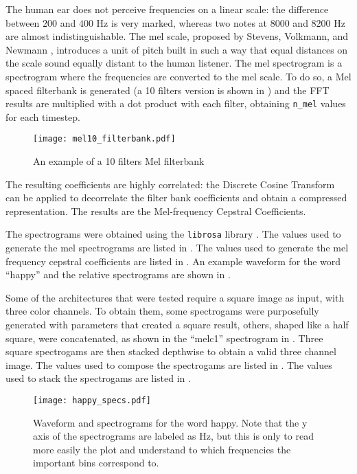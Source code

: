 The human ear does not perceive frequencies on a linear scale: the difference
between $200$ and $400$ Hz is very marked, whereas two notes at $8000$ and
$8200$ Hz are almost indistinguishable. The mel scale, proposed by Stevens,
Volkmann, and Newmann \cite{melscale1937}, introduces a unit of pitch built in
such a way that equal distances on the scale sound equally distant to the human
listener.
The mel spectrogram is a spectrogram where the frequencies are converted to the
mel scale. To do so, a Mel spaced filterbank is generated (a 10 filters version
is shown in ) and the FFT results are multiplied with
a dot product with each filter, obtaining \texttt{n\_mel} values for each
timestep.

\begin{figure}[t!]
    \centering
    \texttt{[image: mel10\_filterbank.pdf]}
    \caption{An example of a 10 filters Mel filterbank}
    \label{fig:mel10_filterbank}
\end{figure}

The resulting coefficients are highly correlated: the Discrete Cosine Transform
can be applied to decorrelate the filter bank coefficients and obtain a
compressed representation.
The results are the Mel-frequency Cepstral Coefficients.

The spectrograms were obtained using the \texttt{librosa} library
\cite{brian_mcfee_2020_3955228}.
The values used to generate the mel spectrograms are listed in
.
The values used to generate the mel frequency cepstral coefficients are listed
in .
An example waveform for the word ``happy'' and the relative spectrograms are
shown in .

Some of the architectures that were tested require a square image as input,
with three color channels.
To obtain them, some spectrogams were purposefully generated with parameters
that created a square result, others, shaped like a half square, were
concatenated, as shown in the ``melc1'' spectrogram in
.
Three square spectrogams are then stacked depthwise to obtain a valid three
channel image.
The values used to compose the spectrogams are listed in .
The values used to stack the spectrogams are listed in .

\begin{figure}[t!]
    \centering
    \texttt{[image: happy\_specs.pdf]}
    \caption{
    Waveform and spectrograms for the word happy. Note that the y axis of the
spectrograms are labeled as Hz, but this is only to read more easily the plot
and understand to which frequencies the important bins correspond to. }%
    \label{fig:happy_specs}
\end{figure}

